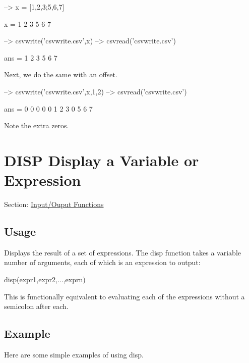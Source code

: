 \begin{DoxyVerbInclude}
--> x = [1,2,3;5,6,7]

x = 
 1 2 3 
 5 6 7 

--> csvwrite('csvwrite.csv',x)
--> csvread('csvwrite.csv')

ans = 
 1 2 3 
 5 6 7 
\end{DoxyVerbInclude}


Next, we do the same with an offset.


\begin{DoxyVerbInclude}
--> csvwrite('csvwrite.csv',x,1,2)
--> csvread('csvwrite.csv')

ans = 
 0 0 0 0 
 0 1 2 3 
 0 5 6 7 
\end{DoxyVerbInclude}


Note the extra zeros. \hypertarget{io_disp}{}\section{D\-I\-S\-P Display a Variable or Expression}\label{io_disp}
Section\-: \hyperlink{sec_io}{Input/\-Ouput Functions} \hypertarget{vtkwidgets_vtkxyplotwidget_Usage}{}\subsection{Usage}\label{vtkwidgets_vtkxyplotwidget_Usage}
Displays the result of a set of expressions. The {\ttfamily disp} function takes a variable number of arguments, each of which is an expression to output\-: \begin{DoxyVerb}  disp(expr1,expr2,...,exprn)
\end{DoxyVerb}
 This is functionally equivalent to evaluating each of the expressions without a semicolon after each. \hypertarget{variables_struct_Example}{}\subsection{Example}\label{variables_struct_Example}
Here are some simple examples of using {\ttfamily disp}.


